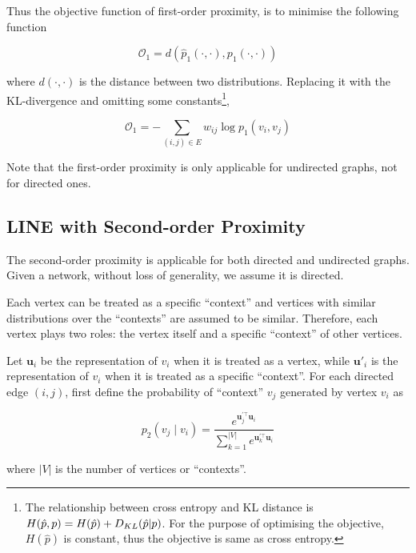 \documentclass[]{article}
\begin{document}
Thus the objective function of first-order proximity, is to minimise the
following function

\begin{equation}
\mathcal{O}_1 = d(\hat{p}_1(\cdot, \cdot), p_1(\cdot, \cdot))
\end{equation}

where \(d(\cdot, \cdot)\) is the distance between two distributions.
Replacing it with the KL-divergence and omitting some
constants\footnote{The relationship between cross entropy and KL
  distance is \(H(\hat{p}, p) = H(\hat{p}) + D_{KL}(\hat{p}\\|p)\). For
  the purpose of optimising the objective, \(H(\hat{p})\) is constant,
  thus the objective is same as cross entropy.},

\begin{equation}
\mathcal{O}_1 = - \sum_{(i,j) \in E} w_{ij}\log p_1(v_i, v_j)
\end{equation}

Note that the first-order proximity is only applicable for undirected
graphs, not for directed ones.

\subsection{LINE with Second-order
Proximity}\label{line-with-second-order-proximity}

The second-order proximity is applicable for both directed and
undirected graphs. Given a network, without loss of generality, we
assume it is directed.

Each vertex can be treated as a specific ``context'' and vertices with
similar distributions over the ``contexts'' are assumed to be similar.
Therefore, each vertex plays two roles: the vertex itself and a specific
``context'' of other vertices.

Let \(\mathbf{u}_i\) be the representation of \(v_i\) when it is treated
as a vertex, while \(\mathbf{u}'_i\) is the representation of \(v_i\)
when it is treated as a specific ``context''. For each directed edge
\((i, j)\), first define the probability of ``context'' \(v_j\)
generated by vertex \(v_i\) as

\begin{equation}
p_2(v_j \mathop{|} v_i) = \frac{e^{\mathbf{u}_j^{'\top} \mathbf{u}_i}}{\sum_{k=1}^{|V|} e^{\mathbf{u}_k^{'\top} \mathbf{u}_i}}
\end{equation}

where \(|V|\) is the number of vertices or ``contexts''.
\end{document}

